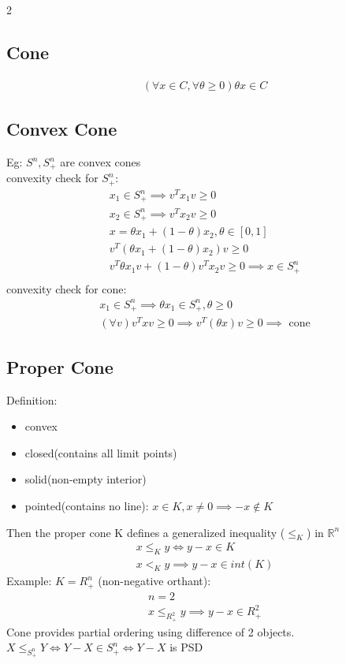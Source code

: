 \documentclass[8pt]{extarticle}
\newcommand{\R}{\mathbb{R}}
\begin{document}
\begin{multicols*}{2}
  \subsection{Cone}
  \begin{align*}
    (\forall x \in C, \forall \theta \geq 0) \theta x \in C
  \end{align*}
  \subsection{Convex Cone}
  Eg: $S^n, S^n_+$ are convex cones\\
  convexity check for $S^n_+$:\\
  \begin{align*}
    x_1 \in S^n_+ \implies v^Tx_1v \geq 0\\
    x_2 \in S^n_+ \implies v^Tx_2v \geq 0\\
    x=\theta x_1 +(1-\theta)x_2, \theta \in [0,1]\\
    v^T(\theta x_1 + (1-\theta)x_2)v \geq 0\\
    v^T\theta x_1 v + (1-\theta)v^T x_2 v \geq 0 \implies x \in S^n_+\\
  \end{align*}
  convexity check for cone:\\
  \begin{align*}
    x_1 \in S^n_+ \implies \theta x_1 \in S^n_+, \theta \geq 0\\
    (\forall v) v^T x v \geq 0 \implies v^T(\theta x) v \geq 0 \implies \text{ cone}
  \end{align*}
  
  \subsection{Proper Cone}
  Definition:
  \begin{itemize}
  \item convex
  \item closed(contains all limit points)
  \item solid(non-empty interior)
  \item pointed(contains no line): $x \in K, x \neq 0 \implies -x \not\in K$
  \end{itemize}
  Then the proper cone K defines a generalized inequality ($\leq_K$) in $\R^n$
  \begin{align*}
    x \leq_K y \iff y-x \in K\\
    x <_K y \implies y-x \in int(K)
  \end{align*}
  Example: $K=R^n_+$ (non-negative orthant):
  \begin{align*}
    n = 2\\
    x \leq_{R^2_+} y \implies y-x \in R^2_+
  \end{align*}
  Cone provides partial ordering using difference of 2 objects.\\
  $X \leq_{S^n_+} Y \iff Y-X \in S^n_+ \iff Y-X$ is PSD


\end{multicols*}
\end{document}
